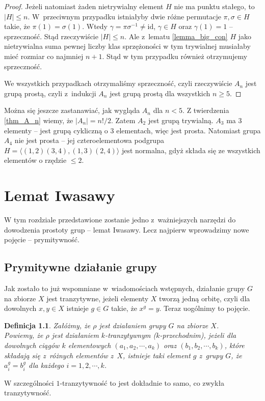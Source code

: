 \documentclass[licencjacka]{pracamgr}
\newtheorem{deff}{Definicja}[section]
\begin{document}
\begin{proof}
    Jeżeli natomiast żaden nietrywialny element $H$ nie ma punktu stałego, to $|H| \le n$.
    W~przeciwnym przypadku istniałyby dwie różne permutacje $\pi, \sigma \in H$ takie, że $\pi(1) = \sigma(1)$.
    Wtedy $\gamma = \pi \sigma ^{-1} \ne \mathrm{id}$, $\gamma \in H$ oraz $\gamma(1) = 1$ -- sprzeczność.
    Stąd rzeczywiście $|H| \le n$.
    Ale z~lematu \ref{lemma_big_con} $H$ jako nietrywialna suma pewnej liczby klas sprzężoności w tym trywialnej musiałaby mieć rozmiar co najmniej $n+1$.
    Stąd w tym przypadku również otrzymujemy sprzeczność.

    We wszystkich przypadkach otrzymaliśmy sprzeczność, czyli rzeczywiście $A_n$ jest grupą prostą,
    czyli z~indukcji $A_n$ jest grupą prostą dla wszystkich $n \ge 5$.
\end{proof}

Można się jeszcze zastanawiać, jak wygląda $A_n$ dla $n < 5$. Z
twierdzenia \ref{thm_A_n} wiemy, że $|A_n| = n!/2$. Zatem $A_2$ jest
grupą trywialną. $A_3$ ma
3 elementy -- jest grupą cykliczną o 3 elementach, więc jest prosta.
Natomiast grupa $A_4$ nie jest prosta -- jej czteroelementowa
podgrupa $H = \langle (1,2)(3,4), (1,3)(2,4) \rangle$ jest normalna,
gdyż składa się ze wszystkich elementów o rzędzie $\le 2$.



\chapter{Lemat Iwasawy}
W tym rozdziale przedstawione zostanie jedno z~ważniejszych narzędzi
do dowodzenia prostoty grup -- lemat Iwasawy. Lecz najpierw
wprowadzimy nowe pojęcie --  prymitywność.

\section{Prymitywne działanie grupy}
Jak zostało to już wspomniane w~wiadomościach wstępnych, działanie
grupy $G$ na zbiorze $X$ jest tranzytywne, jeżeli elementy $X$
tworzą jedną orbitę, czyli dla dowolnych $x, y \in X$ istnieje $g
\in G$ takie, że $x^g = y$. Teraz uogólnimy to pojęcie.

\begin{deff}
    Załóżmy, że $\rho$ jest działaniem grupy $G$ na zbiorze $X$. \\
    Powiemy, że $\rho$ jest \emph{działaniem $k$-tranzytywnym ($k$-przechodnim)},
    jeżeli dla dowolnych ciągów $k$ elementowych $(a_1, a_2, \cdots, a_k)$ oraz $(b_1, b_2, \cdots, b_k)$,
    które składają się z~różnych elementów z~$X$, istnieje taki element $g$ z~grupy $G$, że
    $a_i^g = b_i^g$ dla każdego $i = 1, 2, \cdots, k$.
\end{deff}
W szczególności $1$-tranzytywność to jest dokładnie to samo, co
zwykła tranzytywność.
\end{document}
